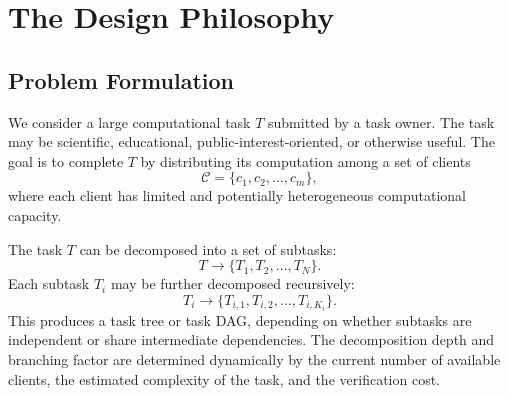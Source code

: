 \documentclass{article}
\theoremstyle{plain}
\begin{document}




\section{The Design Philosophy}
\subsection{Problem Formulation}

We consider a large computational task $T$ submitted by a task owner. The task may be scientific, educational, public-interest-oriented, or otherwise useful. The goal is to complete $T$ by distributing its computation among a set of clients
\[
\mathcal{C} = \{c_1, c_2, \ldots, c_m\},
\]
where each client has limited and potentially heterogeneous computational capacity.

The task $T$ can be decomposed into a set of subtasks:
\[
T \rightarrow \{T_1, T_2, \ldots, T_N\}.
\]
Each subtask $T_i$ may be further decomposed recursively:
\[
T_i \rightarrow \{T_{i,1}, T_{i,2}, \ldots, T_{i,K_i}\}.
\]
This produces a task tree or task DAG, depending on whether subtasks are independent or share intermediate dependencies. The decomposition depth and branching factor are determined dynamically by the current number of available clients, the estimated complexity of the task, and the verification cost.
\end{document}
